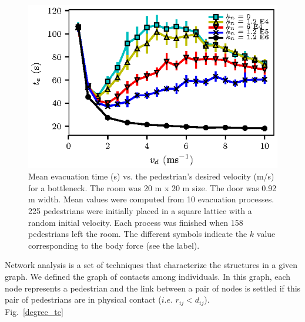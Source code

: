 \documentclass[preprint,12pt]{elsarticle}
\begin{document}
\begin{figure}[htbp!]
\centering
\includegraphics[width=0.7\columnwidth]
{./vd_vs_te_N225.eps}
\caption{\label{vd_vs_te}Mean evacuation time (s) vs. the pedestrian’s desired velocity (m/s) for a bottleneck. The room was 20 m x 20 m size. The door was 0.92 m width. Mean values were computed from 10 evacuation processes. 225 pedestrians were initially placed in a square lattice with a random initial velocity. Each process was finished when 158 pedestrians left the room. The different symbols indicate the $k$ value corresponding to the body force (see the label). }
\end{figure}


Network analysis is a set of techniques that characterize the structures in a given graph. We defined the graph of contacts among individuals. In this graph, each node represents a pedestrian and the link between a pair of nodes is settled if this pair of pedestrians are in physical contact ($i.e.$ $r_{ij}<d_{ij}$).\\

Fig.~\ref{degree_te}
\end{document}

